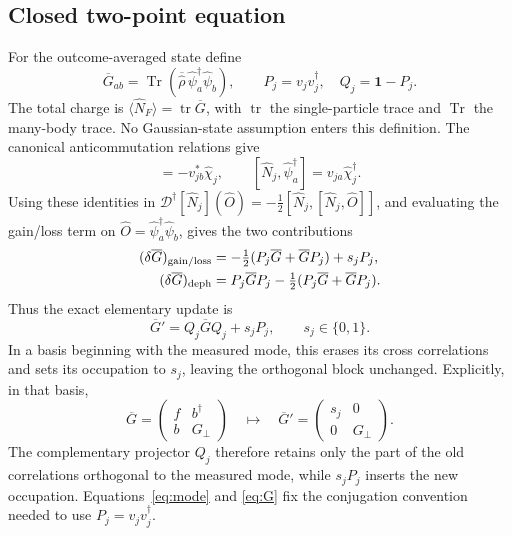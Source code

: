 \documentclass[aps,prb,onecolumn,nofootinbib,superscriptaddress,floatfix]{revtex4-2}
\newcommand{\id}{\mathbf 1}
\newcommand{\Tr}{\operatorname{Tr}}
\newcommand{\tr}{\operatorname{tr}}
\newcommand{\D}{\mathcal D}
\begin{document}
\subsection{Closed two-point equation}
For the outcome-averaged state define
\begin{equation}
 \overline G_{ab}=\Tr(\overline{\hat\rho}\,
             \hat\psi_a^\dagger\hat\psi_b),\qquad
 P_j=v_jv_j^\dagger,\quad Q_j=\id-P_j. \label{eq:G}
\end{equation}
The total charge is $\langle\hat N_F\rangle=\tr\overline G$, with
$\tr$ the single-particle trace and $\Tr$ the many-body trace.
No Gaussian-state assumption enters this definition. The canonical
anticommutation relations give
\begin{equation}
 [\hat N_j,\hat\psi_b]=-v_{jb}^*\hat\chi_j,
 \qquad [\hat N_j,\hat\psi_a^\dagger]=v_{ja}\hat\chi_j^\dagger.
 \label{eq:commutators}
\end{equation}
Using these identities in
$\D^\dagger[\hat N_j](\hat O)
=-\tfrac12[\hat N_j,[\hat N_j,\hat O]]$, and evaluating the
gain/loss term on $\hat O=\hat\psi_a^\dagger\hat\psi_b$,
gives the two contributions
\begin{align}
 (\delta\overline G)_{\rm gain/loss}
   &=-\tfrac12(P_j\overline G+\overline GP_j)+s_jP_j,\nonumber\\
 (\delta\overline G)_{\rm deph}
   &=P_j\overline GP_j-\tfrac12(P_j\overline G+\overline GP_j).
 \label{eq:two_contributions}
\end{align}
Thus the exact elementary update is
\begin{equation}
 \overline G'=Q_j\overline GQ_j+s_jP_j,
 \qquad s_j\in\{0,1\}. \label{eq:resetG}
\end{equation}
In a basis beginning with the measured mode, this erases its cross
correlations and sets its occupation to $s_j$, leaving the
orthogonal block unchanged. Explicitly, in that basis,
\begin{equation}
 \overline G=
 \begin{pmatrix} f&b^\dagger\\ b&G_\perp\end{pmatrix}
 \quad\longmapsto\quad
 \overline G'=
 \begin{pmatrix} s_j&0\\0&G_\perp\end{pmatrix}.
 \label{eq:block_reset}
\end{equation}
The complementary projector $Q_j$ therefore retains only the part
of the old correlations orthogonal to the measured mode, while
$s_jP_j$ inserts the new occupation. Equations~\eqref{eq:mode} and
\eqref{eq:G} fix the conjugation convention needed to use $P_j=v_jv_j^\dagger$.
\end{document}
